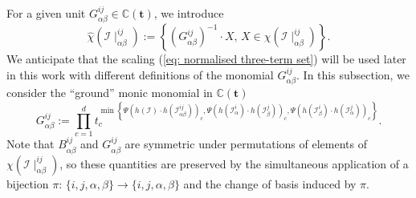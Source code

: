 \documentclass[10pt]{article}
\theoremstyle{remark}%
\theoremstyle{definition}%
\begin{document}
For a given unit $G_{\alpha\beta}^{ij}\in\mathbb{C}(\mathbf{t})$, we introduce 
 \begin{equation}
\hat{\chi}(\mathcal{I}\mid_{\alpha\beta}^{ij}):=\left\{ (G_{\alpha\beta}^{ij})^{-1}\cdot X,\,X\in\chi(\mathcal{I}\mid_{\alpha\beta}^{ij})\right\}.
\label{eq: normalised three-term set}
 \end{equation}
We anticipate that the scaling (\ref{eq: normalised three-term set}) will be used later in this work with different definitions of the monomial $G_{\alpha\beta}^{ij}$. In this subsection, we consider the ``ground'' monic monomial in $\mathbb{C}(\mathbf{t})$ 
\begin{equation}
G_{\alpha\beta}^{ij} := 
\prod_{c=1}^{d}t_{c}^{\min\left\{ \Psi\left(h(\mathcal{I})\cdot h(\mathcal{I}_{\alpha\beta}^{ij})\right)_{c},\Psi\left(h(\mathcal{I}_{\alpha}^{i})\cdot h(\mathcal{I}_{\beta}^{j})\right)_{c},\Psi\left(h(\mathcal{I}_{\beta}^{i})\cdot h(\mathcal{I}_{\alpha}^{j})\right)_{c}\right\} }.
\label{eq: greatest common divisor}
\end{equation}
Note that $B_{\alpha\beta}^{ij}$ and $G_{\alpha\beta}^{ij}$ are symmetric under permutations of elements of $\chi(\mathcal{I}\mid_{\alpha\beta}^{ij})$, so these quantities are preserved by the simultaneous application of a bijection $\pi:\,\{i,j,\alpha,\beta\}\longrightarrow\{i,j,\alpha,\beta\}$ and the change of basis induced by $\pi$. 
\end{document}
